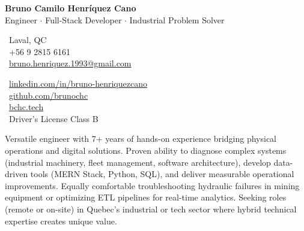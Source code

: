 \documentclass[10pt,letterpaper]{article}
\begin{document}
\begin{center}
    {\Huge \textbf{Bruno Camilo Henríquez Cano}} \\[0.2cm]
    {\Large Engineer $\cdot$ Full-Stack Developer $\cdot$ Industrial Problem Solver}
\end{center}

\vspace{0.3cm}

\noindent
\begin{minipage}[t]{0.5\textwidth}
    \faMapMarker\ Laval, QC \\
    \faPhone\ +56 9 2815 6161 \\
    \faEnvelope\ \href{mailto:bruno.henriquez.1993@gmail.com}{bruno.henriquez.1993@gmail.com}
\end{minipage}
\begin{minipage}[t]{0.5\textwidth}
    \faLinkedin\ \href{https://linkedin.com/in/bruno-henriquezcano}{linkedin.com/in/bruno-henriquezcano} \\
    \faGithub\ \href{https://github.com/brunochc}{github.com/brunochc} \\
    \faGlobe\ \href{https://bchc.tech}{bchc.tech} \\
    \faCar\ Driver's License Class B
\end{minipage}

\vspace{0.4cm}


\vspace{0.2cm}

\noindent Versatile engineer with 7+ years of hands-on experience bridging physical operations and digital solutions. Proven ability to diagnose complex systems (industrial machinery, fleet management, software architecture), develop data-driven tools (MERN Stack, Python, SQL), and deliver measurable operational improvements. Equally comfortable troubleshooting hydraulic failures in mining equipment or optimizing ETL pipelines for real-time analytics. Seeking roles (remote or on-site) in Quebec's industrial or tech sector where hybrid technical expertise creates unique value.

\vspace{0.4cm}


\vspace{0.3cm}
\end{document}
